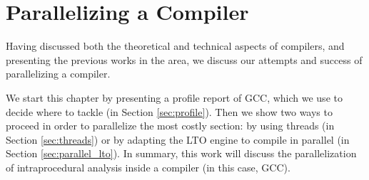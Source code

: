 \chapter{Parallelizing a Compiler}
\label{chap:proposta}

Having discussed both the theoretical and technical aspects of compilers, and
presenting the previous works in the area, we discuss our attempts and success
of parallelizing a compiler.

We start this chapter by presenting a profile report of GCC, which we use to
decide where to tackle (in Section \ref{sec:profile}). Then we show two ways to
proceed in order to parallelize the most costly section: by using threads (in Section
\ref{sec:threads}) or by adapting the LTO engine to compile in parallel (in
Section \ref{sec:parallel_lto}). In summary, this work will discuss the
parallelization of intraprocedural analysis inside a compiler (in this case,
GCC).


